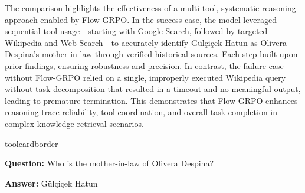 The comparison highlights the effectiveness of a multi-tool, systematic reasoning approach enabled by Flow-GRPO. In the success case, the model leveraged sequential tool usage—starting with Google Search, followed by targeted Wikipedia and Web Search—to accurately identify Gülçiçek Hatun as Olivera Despina's mother-in-law through verified historical sources. Each step built upon prior findings, ensuring robustness and precision. In contrast, the failure case without Flow-GRPO relied on a single, improperly executed Wikipedia query without task decomposition that resulted in a timeout and no meaningful output, leading to premature termination. This demonstrates that Flow-GRPO enhances reasoning trace reliability, tool coordination, and overall task completion in complex knowledge retrieval scenarios.

\begin{custombox}[title=Example from \# 2Wiki]{toolcardborder}

\textbf{Question:} Who is the mother-in-law of Olivera Despina?

\vspace{1em}

\textbf{Answer:} Gülçiçek Hatun
\end{custombox}


